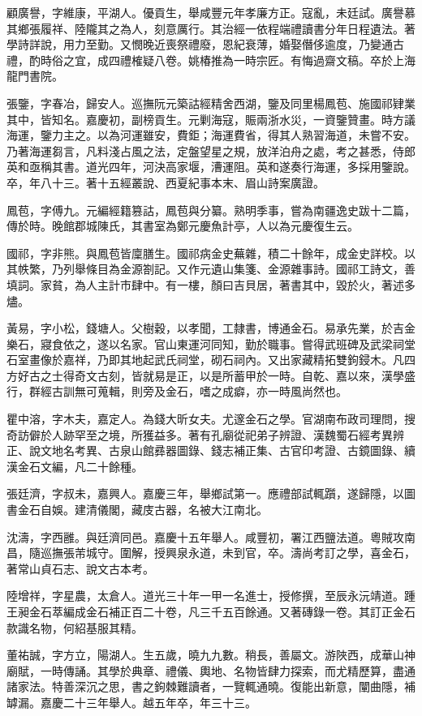 \begin{pinyinscope}
顧廣譽，字維康，平湖人。優貢生，舉咸豐元年孝廉方正。寇亂，未廷試。廣譽慕其鄉張履祥、陸隴其之為人，刻意厲行。其治經一依程端禮讀書分年日程遺法。著學詩詳說，用力至勤。又憫晚近喪祭禮廢，恩紀衰薄，婚娶僭侈逾度，乃變通古禮，酌時俗之宜，成四禮榷疑八卷。姚椿推為一時宗匠。有悔過齋文稿。卒於上海龍門書院。

張鑒，字春冶，歸安人。巡撫阮元築詁經精舍西湖，鑒及同里楊鳳苞、施國祁肄業其中，皆知名。嘉慶初，副榜貢生。元剿海寇，賑兩浙水災，一資鑒贊畫。時方議海運，鑒力主之。以為河運雖安，費鉅；海運費省，得其人熟習海道，未嘗不安。乃著海運芻言，凡料淺占風之法，定盤望星之規，放洋泊舟之處，考之甚悉，侍郎英和亟稱其書。道光四年，河決高家堰，漕運阻。英和遂奏行海運，多採用鑒說。卒，年八十三。著十五經叢說、西夏紀事本末、眉山詩案廣證。

鳳苞，字傅九。元編經籍篡詁，鳳苞與分纂。熟明季事，嘗為南疆逸史跋十二篇，傳於時。晚館郡城陳氏，其書室為鄭元慶魚計亭，人以為元慶復生云。

國祁，字非熊。與鳳苞皆廩膳生。國祁病金史蕪雜，積二十餘年，成金史詳校。以其帙繁，乃列舉條目為金源劄記。又作元遺山集箋、金源雜事詩。國祁工詩文，善填詞。家貧，為人主計市肆中。有一樓，顏曰吉貝居，著書其中，毀於火，著述多燼。

黃易，字小松，錢塘人。父樹穀，以孝聞，工隸書，博通金石。易承先業，於吉金樂石，寢食依之，遂以名家。官山東運河同知，勤於職事。嘗得武班碑及武梁祠堂石室畫像於嘉祥，乃即其地起武氏祠堂，砌石祠內。又出家藏精拓雙鉤鋟木。凡四方好古之士得奇文古刻，皆就易是正，以是所蓄甲於一時。自乾、嘉以來，漢學盛行，群經古訓無可蒐輯，則旁及金石，嗜之成癖，亦一時風尚然也。

瞿中溶，字木夫，嘉定人。為錢大昕女夫。尤邃金石之學。官湖南布政司理問，搜奇訪僻於人跡罕至之境，所獲益多。著有孔廟從祀弟子辨證、漢魏蜀石經考異辨正、說文地名考異、古泉山館彞器圖錄、錢志補正集、古官印考證、古鏡圖錄、續漢金石文編，凡二十餘種。

張廷濟，字叔未，嘉興人。嘉慶三年，舉鄉試第一。應禮部試輒躓，遂歸隱，以圖書金石自娛。建清儀閣，藏庋古器，名被大江南北。

沈濤，字西雝。與廷濟同邑。嘉慶十五年舉人。咸豐初，署江西鹽法道。粵賊攻南昌，隨巡撫張芾城守。圍解，授興泉永道，未到官，卒。濤尚考訂之學，喜金石，著常山貞石志、說文古本考。

陸增祥，字星農，太倉人。道光三十年一甲一名進士，授修撰，至辰永沅靖道。踵王昶金石萃編成金石補正百二十卷，凡三千五百餘通。又著磚錄一卷。其訂正金石款識名物，何紹基服其精。

董祐誠，字方立，陽湖人。生五歲，曉九九數。稍長，善屬文。游陜西，成華山神廟賦，一時傳誦。其學於典章、禮儀、輿地、名物皆肆力探索，而尤精歷算，盡通諸家法。特善深沉之思，書之鉤棘難讀者，一覽輒通曉。復能出新意，闡曲隱，補罅漏。嘉慶二十三年舉人。越五年卒，年三十三。


\end{pinyinscope}
